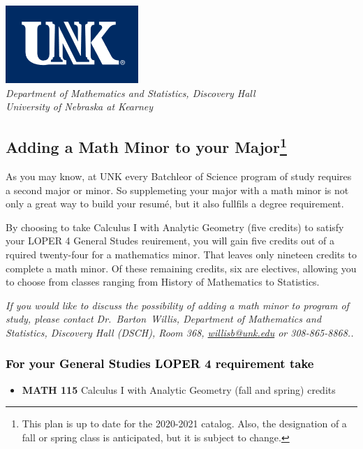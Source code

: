 \documentclass[10pt]{article}
\makeatletter
\newcommand{\calcone}{\textbf{MATH 115} Calculus I with Analytic Geometry (fall and spring) \dotfill 5 credits}
\newcommand{\contactbw}{\mbox{Dr.\ Barton Willis}, Department of Mathematics and Statistics,  Discovery Hall (DSCH), Room 368,
\href{mailto:willisb@unk.edu}{willisb@unk.edu} or 308-865-8868.}
\makeatother
\begin{document}
\newpage
\begin{flushleft}
\includegraphics[scale=0.25]{unk-logo}\\
 \emph{\textcolor{unkblue}{Department of Mathematics and Statistics, Discovery Hall}} \\
  \emph{\textcolor{unkblue}{University of Nebraska at Kearney}}
\end{flushleft}

\subsection*{\textbf{\textcolor{unkblue}{Adding a Math Minor to your Major\footnote[1]{This plan is up to date for the 2020-2021 catalog. Also, the designation of a fall or spring class is anticipated, but it is subject to change.
}}}}

As you may know, at UNK every Batchleor of Science program of study requires a second
major or minor. So supplemeting your major with a math minor is not only a great
way to build your resum\'e, but it also fullfils a degree requirement.

By choosing to take Calculus I with Analytic Geometry (five credits) to satisfy
your LOPER 4 General Studes reuirement, you will gain five credits out of a
rquired twenty-four for a mathematics minor. That leaves only nineteen credits
to complete a math minor.  Of these remaining credits, six are electives, allowing
you to choose from classes ranging from History of Mathematics to Statistics.

\textcolor{unkblue}{\emph{If you would like to discuss the possibility of  adding a
math minor to program of study, please contact \contactbw.}}

\subsubsection*{\textcolor{black}{For your General Studies LOPER 4 requirement take}}
\begin{itemize}
\item \calcone
\end{itemize}
\end{document}
